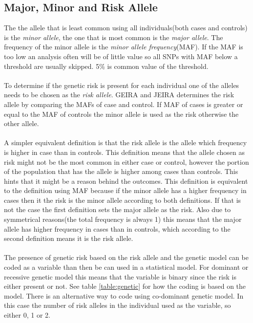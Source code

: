 \documentclass[10pt,a4paper]{report}
\begin{document}
\subsection{Major, Minor and Risk Allele}
\label{risk_allele}
The the allele that is least common using all individuals(both cases and controls) is the \emph{minor allele}, the one that is most common is the \emph{major allele}. The frequency of the minor allele is the \emph{minor allele frequency}(MAF)\cite{uvehag_master_thesis, geira}. If the MAF is too low an analysis often will be of little value so all SNPs with MAF below a threshold are usually skipped. 5\% is common value of the threshold\cite{burton2007genome, geira}.\\
\\
To determine if the genetic risk is present for each individual one of the alleles needs to be chosen as the \emph{risk allele}. GEIRA and JEIRA determines the risk allele by comparing the MAFs of case and control\cite{geisa, uvehag_master_thesis}. If MAF of cases is greater or equal to the MAF of controls the minor allele is used as the risk otherwise the other allele\cite{geisa, uvehag_master_thesis}.\\
\\
A simpler equivalent definition is that the risk allele is the allele which frequency is higher in case than in controls. This definition means that the allele chosen as risk might not be the most common in either case or control, however the portion of the population that has the allele is higher among cases than controls. This hints that it might be a reason behind the outcomes. This definition is equivalent to the definition using MAF because if the minor allele has a higher frequency in cases then it the risk is the minor allele according to both definitions. If that is not the case the first definition sets the major allele as the risk. Also due to symmetrical reasons(the total frequency is always 1) this means that the major allele has higher frequency in cases than in controls, which according to the second definition means it is the risk allele.\\
\\
The presence of genetic risk based on the risk allele and the genetic model can be coded as a variable than then be can used in a statistical model. For dominant or recessive genetic model this means that the variable is binary since the risk is either present or not. See table \ref{table:genetic} for how the coding is based on the model. There is an alternative way to code using co-dominant genetic model. In this case the number of risk alleles in the individual used as the variable, so either 0, 1 or 2. %
\end{document}
